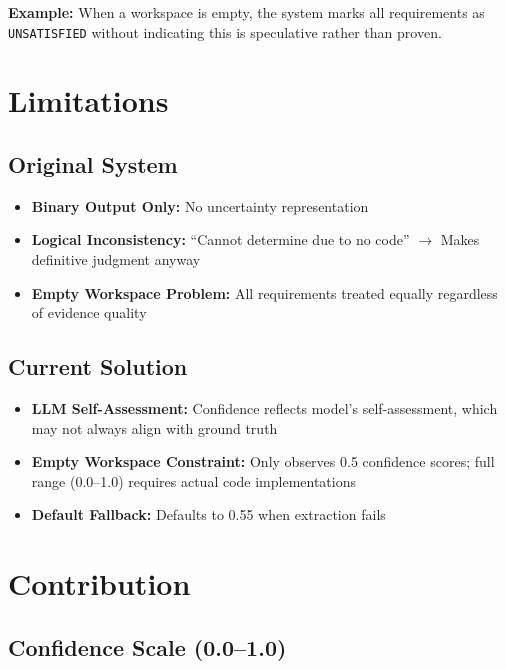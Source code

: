 \documentclass[11pt,a4paper]{article}
\begin{document}
\textbf{Example:} When a workspace is empty, the system marks all requirements as \texttt{UNSATISFIED} without indicating this is speculative rather than proven.

\section{Limitations}

\subsection{Original System}

\begin{itemize}[leftmargin=*]
    \item \textbf{Binary Output Only:} No uncertainty representation
    \item \textbf{Logical Inconsistency:} ``Cannot determine due to no code'' $\rightarrow$ Makes definitive judgment anyway
    \item \textbf{Empty Workspace Problem:} All requirements treated equally regardless of evidence quality
\end{itemize}

\subsection{Current Solution}

\begin{itemize}[leftmargin=*]
    \item \textbf{LLM Self-Assessment:} Confidence reflects model's self-assessment, which may not always align with ground truth
    \item \textbf{Empty Workspace Constraint:} Only observes 0.5 confidence scores; full range (0.0--1.0) requires actual code implementations
    \item \textbf{Default Fallback:} Defaults to 0.55 when extraction fails
\end{itemize}

\section{Contribution}

\subsection{Confidence Scale (0.0--1.0)}
\end{document}
